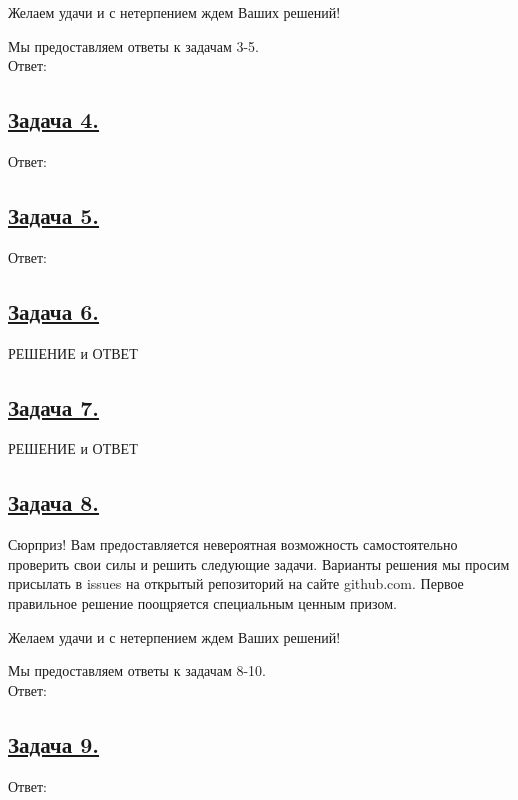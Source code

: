 Желаем удачи и с нетерпением ждем Ваших решений!

Мы предоставляем ответы к задачам 3-5.
\\

Ответ: 

\subsection*{\hyperref[sec:problem4]{Задача 4.}}\label{sec:sol_problem4}

Ответ: 

\subsection*{\hyperref[sec:problem5]{Задача 5.}}\label{sec:sol_problem5}

Ответ: 

\subsection*{\hyperref[sec:problem6]{Задача 6.}}\label{sec:sol_problem6}

РЕШЕНИЕ и ОТВЕТ

\subsection*{\hyperref[sec:problem7]{Задача 7.}}\label{sec:sol_problem7}

РЕШЕНИЕ и ОТВЕТ

\subsection*{\hyperref[sec:problem8]{Задача 8.}}\label{sec:sol_problem8}

Сюрприз! Вам предоставляется невероятная возможность самостоятельно проверить свои силы и решить следующие задачи. Варианты решения мы просим присылать в issues на открытый репозиторий на сайте github.com. Первое правильное решение поощряется специальным ценным призом. 

Желаем удачи и с нетерпением ждем Ваших решений!

Мы предоставляем ответы к задачам 8-10.
\\

Ответ: 

\subsection*{\hyperref[sec:problem9]{Задача 9.}}\label{sec:sol_problem9}

Ответ: 



